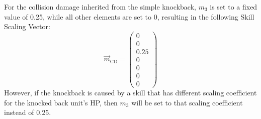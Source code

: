 \documentclass[twocolumn,10pt]{article}
\begin{document}
For the collision damage inherited from the simple knockback, $m_3$ is set to a fixed value of 0.25, while all other elements are set to 0, resulting in the following Skill Scaling Vector:
\begin{equation}
  \vec{m}_{\text{CD}} = \begin{pmatrix} 
  0 \\ 
  0 \\ 
  0.25 \\ 
  0 \\ 
  0 \\ 
  0 \\ 
  0 
  \end{pmatrix}
\end{equation}
However, if the knockback is caused by a skill that has different scaling coefficient for the knocked back unit's HP, then $m_3$ will be set to that scaling coefficient instead of 0.25.
\end{document}
